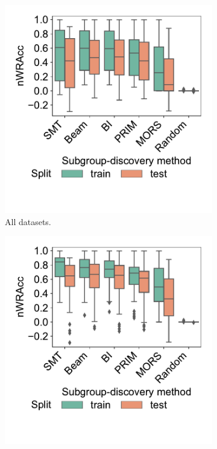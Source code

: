 \documentclass{article}
\theoremstyle{definition}
\begin{document}
\begin{figure}[t]
	\centering
	\begin{subfigure}[t]{0.48\textwidth}
		\centering
		\includegraphics[width=\textwidth, trim=15 55 15 15, clip]{plots/csd-unconstrained-nwracc-all-datasets.pdf}
		\caption{All datasets.}
		\label{fig:csd:unconstrained-nwracc-all-datasets}
	\end{subfigure}
	\hfill
	\begin{subfigure}[t]{0.48\textwidth}
		\centering
		\includegraphics[width=\textwidth, trim=15 55 15 15, clip]{plots/csd-unconstrained-nwracc-no-timeout-datasets.pdf}

\end{subfigure}
\end{figure}
\end{document}
